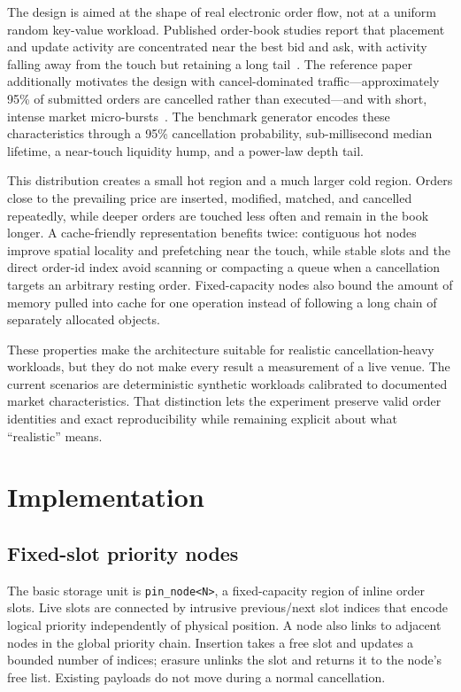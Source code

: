 \documentclass[10pt,twocolumn]{article}
\begin{document}
The design is aimed at the shape of real electronic order flow, not at a uniform
random key-value workload.  Published order-book studies report that placement
and update activity are concentrated near the best bid and ask, with activity
falling away from the touch but retaining a long tail~\cite{gould2013,cont2010}.
The reference paper additionally motivates the design with cancel-dominated
traffic---approximately 95\% of submitted orders are cancelled rather than
executed---and with short, intense market micro-bursts~\cite{yoon2026}.  The
benchmark generator encodes these characteristics through a 95\% cancellation
probability, sub-millisecond median lifetime, a near-touch liquidity hump, and a
power-law depth tail.

This distribution creates a small hot region and a much larger cold region.
Orders close to the prevailing price are inserted, modified, matched, and
cancelled repeatedly, while deeper orders are touched less often and remain in
the book longer.  A cache-friendly representation benefits twice: contiguous
hot nodes improve spatial locality and prefetching near the touch, while stable
slots and the direct order-id index avoid scanning or compacting a queue when a
cancellation targets an arbitrary resting order.  Fixed-capacity nodes also
bound the amount of memory pulled into cache for one operation instead of
following a long chain of separately allocated objects.

These properties make the architecture suitable for realistic cancellation-heavy
workloads, but they do not make every result a measurement of a live venue.  The
current scenarios are deterministic synthetic workloads calibrated to documented
market characteristics.  That distinction lets the experiment preserve valid
order identities and exact reproducibility while remaining explicit about what
``realistic'' means.

\section{Implementation}

\subsection{Fixed-slot priority nodes}

The basic storage unit is \texttt{pin\_node<N>}, a fixed-capacity region of
inline order slots.  Live slots are connected by intrusive previous/next slot
indices that encode logical priority independently of physical position.  A
node also links to adjacent nodes in the global priority chain.  Insertion takes
a free slot and updates a bounded number of indices; erasure unlinks the slot
and returns it to the node's free list.  Existing payloads do not move during a
normal cancellation.
\end{document}
